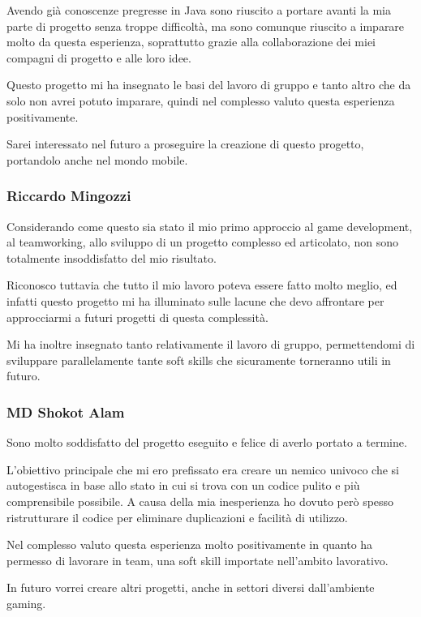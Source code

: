 \documentclass[a4paper,12pt]{report}
\begin{document}
    Avendo già conoscenze pregresse in Java sono riuscito a portare avanti la mia parte di progetto senza troppe difficoltà, ma sono comunque riuscito a imparare molto da questa esperienza, soprattutto grazie alla collaborazione dei miei compagni di progetto e alle loro idee.

    Questo progetto mi ha insegnato le basi del lavoro di gruppo e tanto altro che da solo non avrei potuto imparare, quindi nel complesso valuto questa esperienza positivamente.

    Sarei interessato nel futuro a proseguire la creazione di questo progetto, portandolo anche nel mondo mobile.

    \subsubsection{Riccardo Mingozzi}

    Considerando come questo sia stato il mio primo approccio al game development, al teamworking, allo sviluppo di un progetto complesso ed articolato, non sono totalmente insoddisfatto del mio risultato.

    Riconosco tuttavia che tutto il mio lavoro poteva essere fatto molto meglio, ed infatti questo progetto mi ha illuminato sulle lacune che devo affrontare per approcciarmi a futuri progetti di questa complessità.

    Mi ha inoltre insegnato tanto relativamente il lavoro di gruppo, permettendomi di sviluppare parallelamente tante soft skills che sicuramente torneranno utili in futuro.

    \subsubsection{MD Shokot Alam}

    Sono molto soddisfatto del progetto eseguito e felice  di averlo portato a termine.

    L'obiettivo principale  che mi ero prefissato era creare un nemico univoco che si autogestisca in base allo stato in cui si trova con un codice pulito e più comprensibile possibile. A causa della mia inesperienza ho dovuto però spesso ristrutturare il codice per eliminare duplicazioni e facilità di utilizzo.

    Nel complesso valuto questa esperienza molto positivamente in quanto ha permesso di lavorare in team, una soft skill importate nell'ambito lavorativo.

    In futuro vorrei creare altri progetti, anche in settori diversi dall'ambiente gaming.
\end{document}

